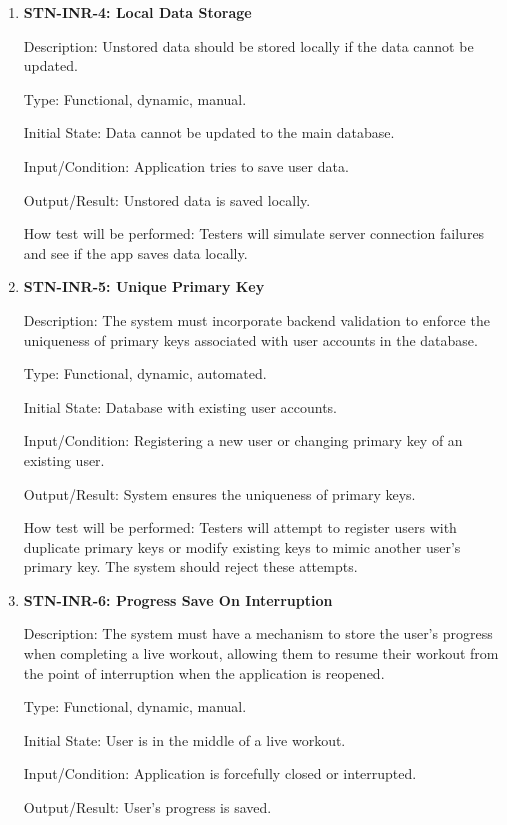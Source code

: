 \documentclass[12pt, titlepage]{article}
\begin{document}
\begin{enumerate}
        \item{\textbf{STN-INR-4: Local Data Storage}}

        Description: Unstored data should be stored locally if the data cannot be updated.

        Type: Functional, dynamic, manual.

        Initial State: Data cannot be updated to the main database.

        Input/Condition: Application tries to save user data.

        Output/Result: Unstored data is saved locally.

        How test will be performed: Testers will simulate server connection failures and see if the app saves data locally.


        \item{\textbf{STN-INR-5: Unique Primary Key}}

        Description: The system must incorporate backend validation to enforce the uniqueness of primary keys associated with user accounts in the database.

        Type: Functional, dynamic, automated.

        Initial State: Database with existing user accounts.

        Input/Condition: Registering a new user or changing primary key of an existing user.

        Output/Result: System ensures the uniqueness of primary keys.

        How test will be performed: Testers will attempt to register users with duplicate primary keys or modify existing keys to mimic another user's primary key. The system should reject these attempts.

        \item{\textbf{STN-INR-6: Progress Save On Interruption}}

        Description: The system must have a mechanism to store the user’s progress when completing a live workout, allowing them to resume their workout from the point of interruption when the application is reopened.

        Type: Functional, dynamic, manual.

        Initial State: User is in the middle of a live workout.

        Input/Condition: Application is forcefully closed or interrupted.

        Output/Result: User's progress is saved.


\end{enumerate}
\end{document}

